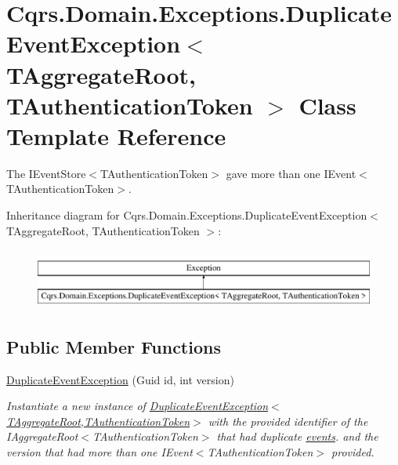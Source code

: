 \hypertarget{classCqrs_1_1Domain_1_1Exceptions_1_1DuplicateEventException}{}\section{Cqrs.\+Domain.\+Exceptions.\+Duplicate\+Event\+Exception$<$ T\+Aggregate\+Root, T\+Authentication\+Token $>$ Class Template Reference}
\label{classCqrs_1_1Domain_1_1Exceptions_1_1DuplicateEventException}


The I\+Event\+Store$<$\+T\+Authentication\+Token$>$ gave more than one I\+Event$<$\+T\+Authentication\+Token$>$.  


Inheritance diagram for Cqrs.\+Domain.\+Exceptions.\+Duplicate\+Event\+Exception$<$ T\+Aggregate\+Root, T\+Authentication\+Token $>$\+:\begin{figure}[H]
\begin{center}
\leavevmode
\includegraphics[height=2.000000cm]{classCqrs_1_1Domain_1_1Exceptions_1_1DuplicateEventException}
\end{center}
\end{figure}
\subsection*{Public Member Functions}
\begin{DoxyCompactItemize}
\item 
\hyperlink{classCqrs_1_1Domain_1_1Exceptions_1_1DuplicateEventException_a33eb0ada16fe2395ea921f571e45c415_a33eb0ada16fe2395ea921f571e45c415}{Duplicate\+Event\+Exception} (Guid id, int version)
\begin{DoxyCompactList}\small\item\em Instantiate a new instance of \hyperlink{classCqrs_1_1Domain_1_1Exceptions_1_1DuplicateEventException_a33eb0ada16fe2395ea921f571e45c415_a33eb0ada16fe2395ea921f571e45c415}{Duplicate\+Event\+Exception$<$\+T\+Aggregate\+Root,\+T\+Authentication\+Token$>$} with the provided identifier of the I\+Aggregate\+Root$<$\+T\+Authentication\+Token$>$ that had duplicate \hyperlink{}{events}. and the {\itshape version}  that had more than one I\+Event$<$\+T\+Authentication\+Token$>$ provided. \end{DoxyCompactList}\end{DoxyCompactItemize}
